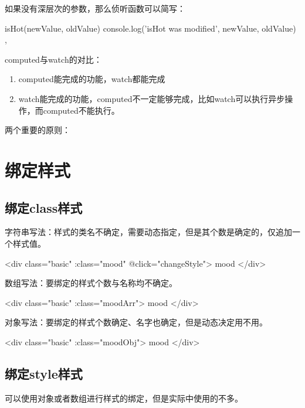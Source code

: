 如果没有深层次的参数，那么侦听函数可以简写：
\begin{js}
isHot(newValue, oldValue) {
    console.log('isHot was modified', newValue, oldValue)
},
\end{js}

computed与watch的对比：
\begin{enumerate}
    \item computed能完成的功能，watch都能完成
    \item watch能完成的功能，computed不一定能够完成，比如watch可以执行异步操作，而computed不能执行。
\end{enumerate}

两个重要的原则：

\section{绑定样式}

\subsection{绑定class样式}
字符串写法：样式的类名不确定，需要动态指定，但是其个数是确定的，仅追加一个样式值。
\begin{html}
<div class="basic" :class="mood" @click="changeStyle">{{ mood  }}</div>
\end{html}

数组写法：要绑定的样式个数与名称均不确定。
\begin{html}
<div class="basic" :class="moodArr">{{ mood }}</div>
\end{html}

对象写法：要绑定的样式个数确定、名字也确定，但是动态决定用不用。
\begin{html}
<div class="basic" :class="moodObj">{{ mood }}</div>
\end{html}
\subsection{绑定style样式}
可以使用对象或者数组进行样式的绑定，但是实际中使用的不多。

